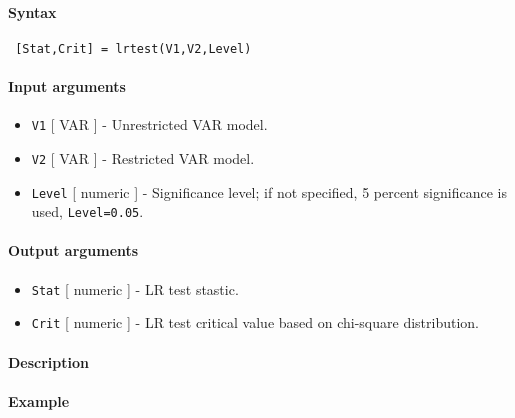 


	\paragraph{Syntax}
 
 \begin{verbatim}
 [Stat,Crit] = lrtest(V1,V2,Level)
 \end{verbatim}
 
 \paragraph{Input arguments}
 
 \begin{itemize}
 \item
   \texttt{V1} {[} VAR {]} - Unrestricted VAR model.
 \item
   \texttt{V2} {[} VAR {]} - Restricted VAR model.
 \item
   \texttt{Level} {[} numeric {]} - Significance level; if not specified,
   5 percent significance is used, \texttt{Level=0.05}.
 \end{itemize}
 
 \paragraph{Output arguments}
 
 \begin{itemize}
 \item
   \texttt{Stat} {[} numeric {]} - LR test stastic.
 \item
   \texttt{Crit} {[} numeric {]} - LR test critical value based on
   chi-square distribution.
 \end{itemize}
 
 \paragraph{Description}
 
 \paragraph{Example}


